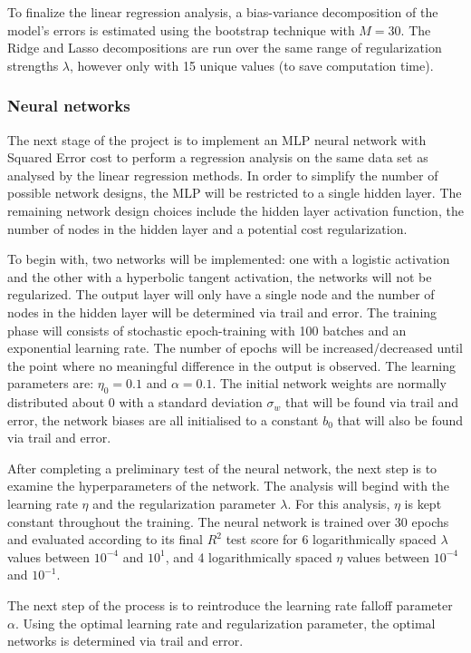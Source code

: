\documentclass[nofootinbib,reprint,english]{revtex4-1}
\begin{document}
To finalize the linear regression analysis, a bias-variance decomposition of the model's errors is estimated using the bootstrap technique with \(M=30\). The Ridge and Lasso decompositions are run over the same range of regularization strengths \(\lambda\), however only with 15 unique values (to save computation time).
\subsubsection{Neural networks}
The next stage of the project is to implement an MLP neural network with Squared Error cost to perform a regression analysis on the same data set as analysed by the linear regression methods. In order to simplify the number of possible network designs, the MLP will be restricted to a single hidden layer. The remaining network design choices include the hidden layer activation function, the number of nodes in the hidden layer and a potential cost regularization.

To begin with, two networks will be implemented: one with a logistic activation and the other with a hyperbolic tangent activation, the networks will not be regularized. The output layer will only have a single node and the number of nodes in the hidden layer will be determined via trail and error. The training phase will consists of stochastic epoch-training with 100 batches and an exponential learning rate. The number of epochs will be increased/decreased until the point where no meaningful difference in the output is observed. The learning parameters are: \(\eta_0=0.1\) and \(\alpha=0.1\). The initial network weights are normally distributed about 0 with a standard deviation \(\sigma_w\) that will be found via trail and error, the network biases are all initialised to a constant \(b_0\) that will also be found via trail and error.

After completing a preliminary test of the neural network, the next step is to examine the hyperparameters of the network. The analysis will begind with the learning rate \(\eta\) and the regularization parameter \(\lambda\). For this analysis, \(\eta\) is kept constant throughout the training. The neural network is trained over 30 epochs and evaluated according to its final \(R^2\) test score for 6 logarithmically spaced \(\lambda\) values between \(10^{-4}\) and \(10^1\), and 4 logarithmically spaced \(\eta\) values between \(10^{-4}\) and \(10^{-1}\).

The next step of the process is to reintroduce the learning rate falloff parameter \(\alpha\). Using the optimal learning rate and regularization parameter, the optimal networks is determined via trail and error.
\end{document}
